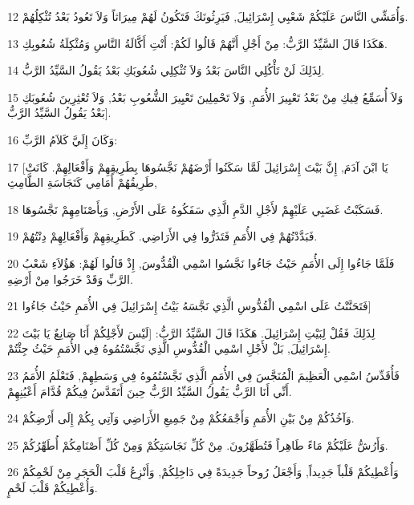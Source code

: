 \par 12 وَأُمَشِّي النَّاسَ عَلَيْكُمْ شَعْبِي إِسْرَائِيلَ, فَيَرِثُونَكَ فَتَكُونُ لَهُمْ مِيرَاثاً وَلاَ تَعُودُ بَعْدُ تُثْكِلُهُمْ.
\par 13 هَكَذَا قَالَ السَّيِّدُ الرَّبُّ: مِنْ أَجْلِ أَنَّهُمْ قَالُوا لَكُمْ: أَنْتِ أَكَّالَةُ النَّاسِ وَمُثْكِلَةُ شُعُوبِكِ.
\par 14 لِذَلِكَ لَنْ تَأْكُلِي النَّاسَ بَعْدُ وَلاَ تُثْكِلِي شُعُوبَكِ بَعْدُ يَقُولُ السَّيِّدُ الرَّبُّ.
\par 15 وَلاَ أُسَمِّعُ فِيكِ مِنْ بَعْدُ تَعْيِيرَ الأُمَمِ, وَلاَ تَحْمِلِينَ تَعْيِيرَ الشُّعُوبِ بَعْدُ, وَلاَ تُعْثِرِينَ شُعُوبَكِ بَعْدُ يَقُولُ السَّيِّدُ الرَّبُّ].
\par 16 وَكَانَ إِلَيَّ كَلاَمُ الرَّبِّ:
\par 17 [يَا ابْنَ آدَمَ, إِنَّ بَيْتَ إِسْرَائِيلَ لَمَّا سَكَنُوا أَرْضَهُمْ نَجَّسُوهَا بِطَرِيقِهِمْ وَأَفْعَالِهِمْ. كَانَتْ طَرِيقُهُمْ أَمَامِي كَنَجَاسَةِ الطَّامِثِ,
\par 18 فَسَكَبْتُ غَضَبِي عَلَيْهِمْ لأَجْلِ الدَّمِ الَّذِي سَفَكُوهُ عَلَى الأَرْضِ, وَبِأَصْنَامِهِمْ نَجَّسُوهَا.
\par 19 فَبَدَّدْتُهُمْ فِي الأُمَمِ فَتَذَرُّوا فِي الأَرَاضِي. كَطَرِيقِهِمْ وَأَفْعَالِهِمْ دِنْتُهُمْ.
\par 20 فَلَمَّا جَاءُوا إِلَى الأُمَمِ حَيْثُ جَاءُوا نَجَّسُوا اسْمِي الْقُدُّوسَ, إِذْ قَالُوا لَهُمْ: هَؤُلاَءِ شَعْبُ الرَّبِّ وَقَدْ خَرَجُوا مِنْ أَرْضِهِ.
\par 21 فَتَحَنَّنْتُ عَلَى اسْمِي الْقُدُّوسِ الَّذِي نَجَّسَهُ بَيْتُ إِسْرَائِيلَ فِي الأُمَمِ حَيْثُ جَاءُوا]
\par 22 لِذَلِكَ فَقُلْ لِبَيْتِ إِسْرَائِيلَ. هَكَذَا قَالَ السَّيِّدُ الرَّبُّ: [لَيْسَ لأَجْلِكُمْ أَنَا صَانِعٌ يَا بَيْتَ إِسْرَائِيلَ, بَلْ لأَجْلِ اسْمِي الْقُدُّوسِ الَّذِي نَجَّسْتُمُوهُ فِي الأُمَمِ حَيْثُ جِئْتُمْ.
\par 23 فَأُقَدِّسُ اسْمِي الْعَظِيمَ الْمُنَجَّسَ فِي الأُمَمِ الَّذِي نَجَّسْتُمُوهُ فِي وَسَطِهِمْ, فَتَعْلَمُ الأُمَمُ أَنِّي أَنَا الرَّبُّ يَقُولُ السَّيِّدُ الرَّبُّ حِينَ أَتَقَدَّسُ فِيكُمْ قُدَّامَ أَعْيُنِهِمْ.
\par 24 وَآخُذُكُمْ مِنْ بَيْنِ الأُمَمِ وَأَجْمَعُكُمْ مِنْ جَمِيعِ الأَرَاضِي وَآتِي بِكُمْ إِلَى أَرْضِكُمْ.
\par 25 وَأَرُشُّ عَلَيْكُمْ مَاءً طَاهِراً فَتُطَهَّرُونَ. مِنْ كُلِّ نَجَاسَتِكُمْ وَمِنْ كُلِّ أَصْنَامِكُمْ أُطَهِّرُكُمْ.
\par 26 وَأُعْطِيكُمْ قَلْباً جَدِيداً, وَأَجْعَلُ رُوحاً جَدِيدَةً فِي دَاخِلِكُمْ, وَأَنْزِعُ قَلْبَ الْحَجَرِ مِنْ لَحْمِكُمْ وَأُعْطِيكُمْ قَلْبَ لَحْمٍ.
